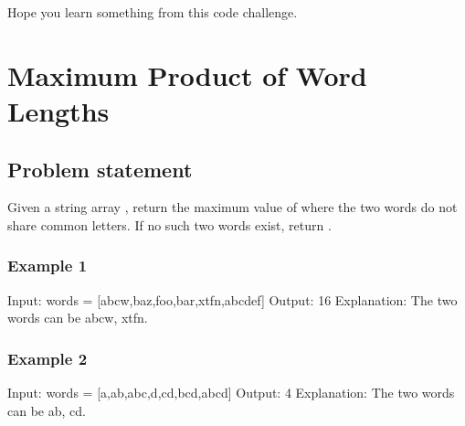 \documentclass[letterpaper,12pt,english]{book}
\begin{document}
\sphinxAtStartPar
Hope you learn something from this code challenge.

\sphinxAtStartPar
{}

\sphinxstepscope


\section{Maximum Product of Word Lengths}
\label{\detokenize{Mathematics/09_MTH_318_Maximum_Product_of_Word_Lengths:maximum-product-of-word-lengths}}\label{\detokenize{Mathematics/09_MTH_318_Maximum_Product_of_Word_Lengths::doc}}

\subsection{Problem statement\sphinxfootnotemark[123]}
\label{\detokenize{Mathematics/09_MTH_318_Maximum_Product_of_Word_Lengths:problem-statement}}%
\begin{footnotetext}[123]\sphinxAtStartFootnote
{}
%
\end{footnotetext}\ignorespaces 
\sphinxAtStartPar
Given a string array , return the maximum value of  where the two words do not share common letters. If no such two words exist, return .


\subsubsection{Example 1}
\label{\detokenize{Mathematics/09_MTH_318_Maximum_Product_of_Word_Lengths:example-1}}
\begin{sphinxVerbatim}[commandchars=\\\{\}]
Input: words = [\PYGZdq{}abcw\PYGZdq{},\PYGZdq{}baz\PYGZdq{},\PYGZdq{}foo\PYGZdq{},\PYGZdq{}bar\PYGZdq{},\PYGZdq{}xtfn\PYGZdq{},\PYGZdq{}abcdef\PYGZdq{}]
Output: 16
Explanation: The two words can be \PYGZdq{}abcw\PYGZdq{}, \PYGZdq{}xtfn\PYGZdq{}.
\end{sphinxVerbatim}


\subsubsection{Example 2}
\label{\detokenize{Mathematics/09_MTH_318_Maximum_Product_of_Word_Lengths:example-2}}
\begin{sphinxVerbatim}[commandchars=\\\{\}]
Input: words = [\PYGZdq{}a\PYGZdq{},\PYGZdq{}ab\PYGZdq{},\PYGZdq{}abc\PYGZdq{},\PYGZdq{}d\PYGZdq{},\PYGZdq{}cd\PYGZdq{},\PYGZdq{}bcd\PYGZdq{},\PYGZdq{}abcd\PYGZdq{}]
Output: 4
Explanation: The two words can be \PYGZdq{}ab\PYGZdq{}, \PYGZdq{}cd\PYGZdq{}.
\end{sphinxVerbatim}
\end{document}
